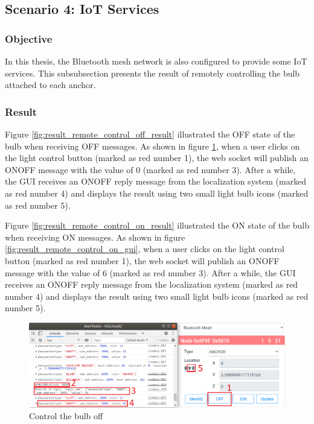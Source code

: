 \documentclass[\main/thesis.tex]{subfiles}
\begin{document}
\subsection{Scenario 4: IoT Services}
\subsubsection{Objective}
In this thesis, the Bluetooth mesh network is also configured to provide some IoT services. This subsubsection presents the result of remotely controlling the bulb attached to each anchor.
\subsubsection{Result}

Figure \ref{fig:result_remote_control_off_result} illustrated the OFF state of the bulb when receiving OFF messages. As shown in figure \ref{fig:result_remote_control_off_gui}, when a user clicks on the light control button (marked as red number 1), the web socket will publish an ONOFF message with the value of 0 (marked as red number 3). After a while, the GUI receives an ONOFF reply message from the localization system (marked as red number 4) and displays the result using two small light bulb icons (marked as red number 5).

Figure \ref{fig:result_remote_control_on_result} illustrated the ON state of the bulb when receiving ON messages. As shown in figure \ref{fig:result_remote_control_on_gui}, when a user clicks on the light control button (marked as red number 1), the web socket will publish an ONOFF message with the value of 6 (marked as red number 3). After a while, the GUI receives an ONOFF reply message from the localization system (marked as red number 4) and displays the result using two small light bulb icons (marked as red number 5).

\begin{figure}[H]
    \centering
    \includegraphics[width=1\textwidth]{result_remote_control_off_gui.png}
    \caption{Control the bulb off}
    \label{fig:result_remote_control_off_gui}
\end{figure}
\end{document}
